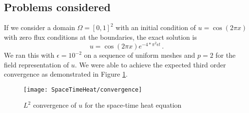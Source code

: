 \documentclass[Proposal.tex]{subfiles}
\begin{document}

\subsection{Problems considered}
If we consider a domain $\Omega=[0,1]^2$ with an initial condition of $u=\cos(2\pi x)$ with zero flux conditions at the boundaries,
the exact solution is
\begin{equation*}
	u=\cos(2\pi x)e^{-4*\pi^2\epsilon t}\,.
\end{equation*}
We ran this with $\epsilon=10^{-2}$ on a sequence of uniform meshes and $p=2$ for the field representation of $u$. 
We were able to achieve the expected third order convergence as demonstrated in Figure \ref{fig:spaceTimeHeatConvergence}.

\begin{figure}[!ht]
	\centering
	\texttt{[image: SpaceTimeHeat/convergence]}
	\caption{$L^2$ convergence of $u$ for the space-time heat equation}
	\label{fig:spaceTimeHeatConvergence}
\end{figure}
\end{document}
